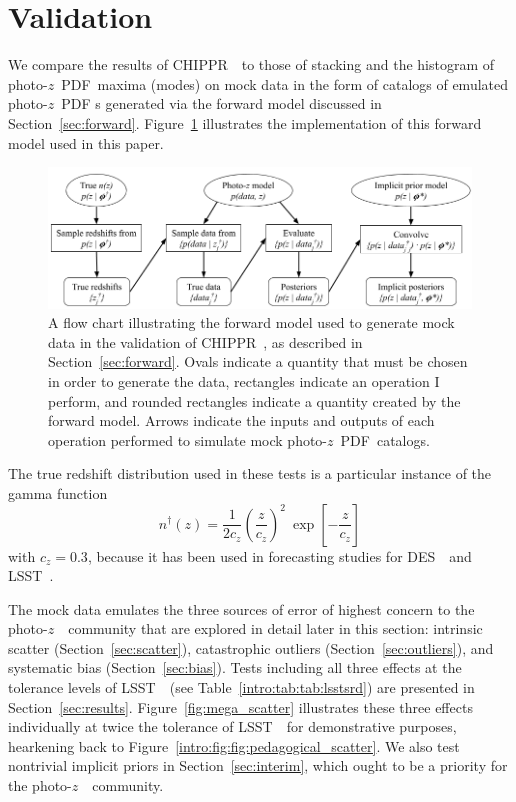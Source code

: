 \documentclass[iop]{emulateapj}
\newcommand{\Sect}[1]{Section~\ref{#1}}
\newcommand{\Fig}[1]{Figure~\ref{#1}}
\newcommand{\project}[1]{{\textsc{#1}}~}
\newcommand{\lsst}{\project{LSST}}
\newcommand{\des}{\project{DES}}
\newcommand{\Chippr}{\project{CHIPPR}}
\newcommand{\pz}{photo-$z$~}
\newcommand{\pzpdf}{\pz PDF}
\begin{document}
\section{Validation}
\label{sec:alldata}

We compare the results of \Chippr\ to those of stacking and the histogram of 
\pzpdf\ maxima (modes) on mock data in the form of catalogs of emulated \pzpdf 
s generated via the forward model discussed in \Sect{sec:forward}.
\Fig{fig:flowchart} illustrates the implementation of this forward model used 
in this paper.

\begin{figure}
	\begin{center}
		\includegraphics[width=\textwidth]{figures/chippr/flowchart.png}
		\caption{A flow chart illustrating the forward model used to 
generate mock data in the validation of \Chippr, as described in 
\Sect{sec:forward}.
			Ovals indicate a quantity that must be chosen in order 
to generate the data, rectangles indicate an operation I perform, and rounded 
rectangles indicate a quantity created by the forward model.
			Arrows indicate the inputs and outputs of each 
operation performed to simulate mock \pzpdf\ catalogs.}
		\label{fig:flowchart}
	\end{center}
\end{figure}

The true redshift distribution used in these tests is a particular instance of 
the gamma function
\begin{equation}
\label{eqn:gamma}
n^{\dagger}(z) = \frac{1}{2 c_{z}} \left(\frac{z}{c_{z}}\right)^{2}\ 
\exp\left[-\frac{z}{c_{z}}\right]
\end{equation}
with $c_{z} = 0.3$, because it has been used in forecasting studies for \des\ 
and \lsst.

The mock data emulates the three sources of error of highest concern to the 
\pz\ community that are explored in detail later in this section: intrinsic 
scatter (\Sect{sec:scatter}), catastrophic outliers (\Sect{sec:outliers}), and 
systematic bias (\Sect{sec:bias}).
Tests including all three effects at the tolerance levels of \lsst\ (see 
Table~\ref{intro:tab:tab:lsstsrd}) are presented in \Sect{sec:results}.
\Fig{fig:mega_scatter} illustrates these three effects individually at twice 
the tolerance of \lsst\ for demonstrative purposes, hearkening back to 
Figure~\ref{intro:fig:fig:pedagogical_scatter}.
We also test nontrivial implicit priors in \Sect{sec:interim}, which ought to 
be a priority for the \pz\ community.
\end{document}

